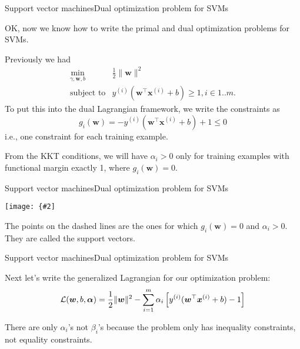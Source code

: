 \documentclass{beamer}
\renewcommand{\vec}[1]{\boldsymbol{#1}}
\newcommand{\myfig}[3]{\centerline{\texttt{[image: \{\#2]}}}
    \centerline{\scriptsize #3}}
\begin{document}
\begin{frame}{Support vector machines}{Dual optimization problem for SVMs}

  OK, now we know how to write the primal and dual optimization problems
  for SVMs.

  \medskip

  Previously we had
  \[
  \begin{array}{rl}
    \min_{\gamma,\vec{w},b} & \frac{1}{2} \| \vec{w} \|^2 \\
    \text{subject to} & y^{(i)}(\vec{w}^\top\vec{x}^{(i)} + b) \ge 1, i \in 1..m .
  \end{array}
  \]  
  To put this into the dual Lagrangian framework, we write the constraints
  as
  \[ g_i(\vec{w}) = -y^{(i)}(\vec{w}^\top \vec{x}^{(i)} + b) + 1 \le 0 \]
  i.e., one constraint for each training example.

  \medskip

  From the KKT conditions, we will have $\alpha_i > 0$ only for
  training examples with functional margin exactly 1, where
  $g_i(\vec{w}) = 0$.

\end{frame}


\begin{frame}{Support vector machines}{Dual optimization problem for SVMs}

  \myfig{2.5in}{svs}{Ng, CS229 lecture notes set 3}

  \medskip

  The points on the dashed lines are the ones for which $g_i(\vec{w})=0$ and
  $\alpha_i>0$. They are called the \alert{support vectors}.
  
\end{frame}


\begin{frame}{Support vector machines}{Dual optimization problem for SVMs}

  Next let's write the generalized Lagrangian for our optimization problem:
  \[ {\cal L}(\vec{w},b,\vec{\alpha}) = \frac{1}{2}\|\vec{w}\|^2
  - \sum_{i=1}^m \alpha_i \left[ y^{(i)}(\vec{w}^\top\vec{x}^{(i)} +b)-1\right] \]

  There are only $\alpha_i$'s not $\beta_i$'s because the problem only
  has inequality constraints, not equality constraints.
  
\end{frame}
\end{document}
